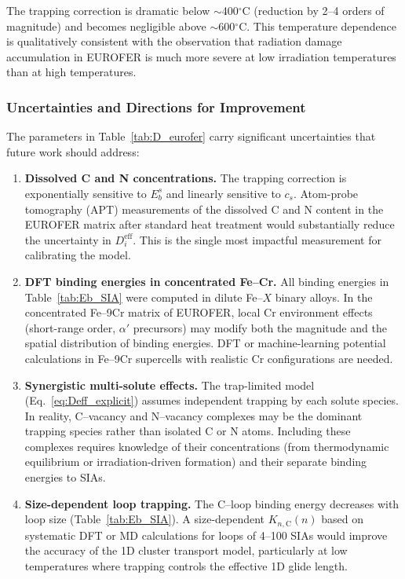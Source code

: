 \documentclass[pdflatex,sn-basic]{sn-jnl} %
\begin{document}
The trapping correction is dramatic below $\sim$400$^\circ$C (reduction by
2--4 orders of magnitude) and becomes negligible above $\sim$600$^\circ$C. This
temperature dependence is qualitatively consistent with the observation that
radiation damage accumulation in EUROFER is much more severe at low irradiation
temperatures than at high temperatures.

\subsubsection{Uncertainties and Directions for Improvement}
\label{sec:future}

The parameters in Table~\ref{tab:D_eurofer} carry significant uncertainties
that future work should address:

\begin{enumerate}
    \item \textbf{Dissolved C and N concentrations.} The trapping correction is
    exponentially sensitive to $E_b^s$ and linearly sensitive to $c_s$.
    Atom-probe tomography (APT) measurements of the dissolved C and N content
    in the EUROFER matrix after standard heat treatment would substantially
    reduce the uncertainty in $D_i^{\mathrm{eff}}$. This is the single most
    impactful measurement for calibrating the model.

    \item \textbf{DFT binding energies in concentrated Fe--Cr.}
    All binding energies in Table~\ref{tab:Eb_SIA} were computed in dilute
    Fe--$X$ binary alloys. In the concentrated Fe--9Cr matrix of EUROFER, local
    Cr environment effects (short-range order, $\alpha'$ precursors) may modify
    both the magnitude and the spatial distribution of binding energies. DFT or
    machine-learning potential calculations in Fe--9Cr supercells with
    realistic Cr configurations are needed.

    \item \textbf{Synergistic multi-solute effects.}
    The trap-limited model (Eq.~\ref{eq:Deff_explicit}) assumes independent
    trapping by each solute species. In reality, C--vacancy and N--vacancy
    complexes may be the dominant trapping species rather than isolated C or N
    atoms. Including these complexes requires knowledge of their
    concentrations (from thermodynamic equilibrium or irradiation-driven
    formation) and their separate binding energies to SIAs.

    \item \textbf{Size-dependent loop trapping.}
    The C--loop binding energy decreases with loop size
    (Table~\ref{tab:Eb_SIA}). A size-dependent $K_{n,\mathrm{C}}(n)$ based on
    systematic DFT or MD calculations for loops of 4--100 SIAs would improve
    the accuracy of the 1D cluster transport model, particularly at low
    temperatures where trapping controls the effective 1D glide length.


\end{enumerate}
\end{document}
